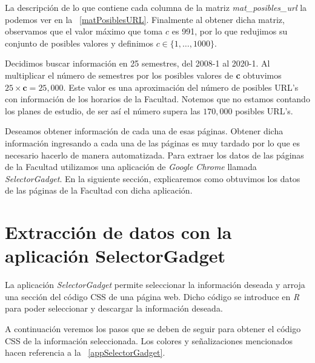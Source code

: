 La descripción de lo que contiene cada columna de la matriz \textit{mat\_posibles\_url} la podemos ver en la \tablename{~\ref{matPosiblesURL}}. Finalmente al obtener dicha matriz, observamos que el valor máximo que toma $c$ es 991, por lo que redujimos su conjunto de posibles valores y definimos $c \in \{1, \ldots, 1 000\}$.

\dfNmatrizChica %

Decidimos buscar información en 25 semestres, del 2008-1 al 2020-1. Al multiplicar el número de semestres por los posibles valores de \textbf{c} obtuvimos $25 \times \textbf{c} = 25,000$. Este valor es una aproximación del número de posibles URL's con información de los horarios de la Facultad. Notemos que no estamos contando los planes de estudio, de ser así el número supera las $170,000$ posibles URL's.

Deseamos obtener información de cada una de esas páginas. Obtener dicha información ingresando a cada una de las páginas es muy tardado por lo que es necesario hacerlo de manera automatizada. Para extraer los datos de las páginas de la Facultad utilizamos una aplicación de \textit{Google Chrome} llamada \textit{SelectorGadget}. En la siguiente sección, explicaremos como obtuvimos los datos de las páginas de la Facultad con dicha aplicación.

\section{Extracción de datos con la aplicación SelectorGadget} \label{sec_ED_SelectorGadget}

La aplicación \textit{SelectorGadget} permite seleccionar la información deseada y arroja una sección del código CSS de una página web. Dicho código se introduce en \textit{R} para poder seleccionar y descargar la información deseada.

A continuación veremos los pasos que se deben de seguir para obtener el código CSS de la información seleccionada. Los colores y señalizaciones mencionados hacen referencia a la \figurename{~\ref{appSelectorGadget}}. %

